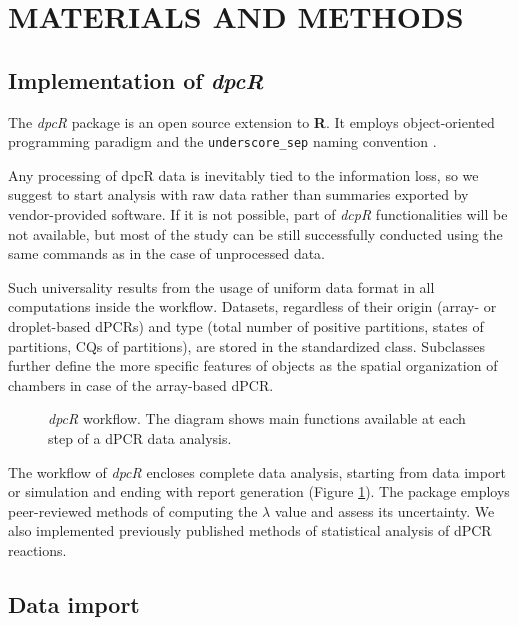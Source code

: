 \documentclass[a4,center,fleqn]{NAR}
\begin{document}
\section{MATERIALS AND METHODS}

\subsection{Implementation of \textit{dpcR}}

The \textit{dpcR} package is an open source extension to \textbf{R}. It 
employs object-oriented programming paradigm and the \texttt{underscore\_sep} 
naming convention \cite{Baaaath_2012}.

Any processing of dpcR data is inevitably tied to the information loss, so we 
suggest to start analysis with raw data rather than summaries exported by 
vendor-provided software. If it is not possible, part of \textit{dcpR} 
functionalities will be not available, but most of the study can be still 
successfully conducted using the same commands as in the case of unprocessed 
data. 

Such universality results from the usage of uniform data format in all 
computations inside the workflow. Datasets, regardless of their origin (array- 
or droplet-based dPCRs) and type (total number of positive partitions, states of 
partitions, CQs of partitions), are stored in the standardized class. Subclasses 
further define the more specific features of objects as the spatial organization 
of chambers in case of the array-based dPCR.

\begin{figure}[t]
\begin{center}
\end{center}
\caption{\textit{dpcR} workflow. The diagram shows main functions 
available at each step of a dPCR data analysis.}
\label{workflow}
\end{figure}

The workflow of \textit{dpcR} encloses complete data analysis, starting from 
data import or simulation and ending with report generation (Figure 
\ref{workflow}). The package employs peer-reviewed methods of computing the 
$\lambda$ value and assess its uncertainty. We also implemented previously 
published methods of statistical analysis of dPCR reactions.

\subsection{Data import}
\end{document}
